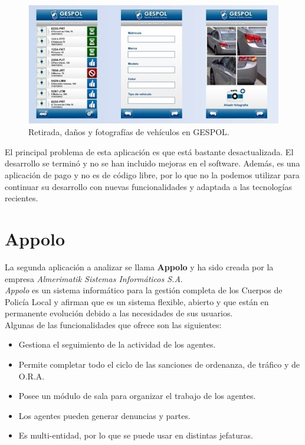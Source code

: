\begin{figure}[H]
	\centering
	\includegraphics[scale=0.65]{imagenes/gespol1.jpg}
	\caption{Retirada, daños y fotografías de vehículos en GESPOL. \label{fig:figura17}}
\end{figure}

El principal problema de esta aplicación es que está bastante desactualizada. El desarrollo se terminó y no se han incluido mejoras en el software. Además,
es una aplicación de pago y no es de código libre, por lo que no la podemos utilizar para continuar su desarrollo con nuevas funcionalidades y adaptada a las tecnologías recientes.

\section{Appolo}
La segunda aplicación a analizar se llama \textbf{Appolo} y ha sido creada por la empresa \textit{Almerimatik Sistemas Informáticos S.A}. \\

\textit{Appolo} es un sistema informático para la gestión completa de los Cuerpos de Policía Local y afirman que es un sistema
flexible, abierto y que están en permanente evolución debido a las necesidades de sus usuarios.\\

Algunas de las funcionalidades que ofrece son las siguientes:
\begin{itemize}
	\item Gestiona el seguimiento de la actividad de los agentes.
	\item Permite completar todo el ciclo de las sanciones de ordenanza, de tráfico y de O.R.A. 
	\item Posee un módulo de sala para organizar el trabajo de los agentes.
	\item Los agentes pueden generar denuncias y partes.
	\item Es multi-entidad, por lo que se puede usar en distintas jefaturas.
\end{itemize}

